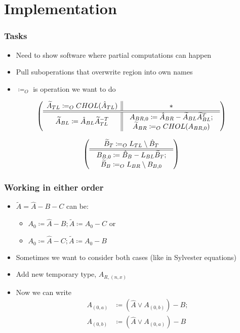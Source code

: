 \documentclass{beamer}
\begin{document}
\section{Implementation}

\frame{\sectionpage}

\begin{frame}
  \frametitle{Tasks}
  \begin{itemize}
  \item Need to show software where partial computations can happen
  \item Pull suboperations that overwrite region into own names
  \item $\coloneqq_O$ is operation we want to do
  \end{itemize}
  \begin{equation*}
    \left( \begin{array}{c || c} \widetilde{A}_{TL} \coloneqq_O CHOL(\hat{A}_{TL}) & * \\ \hline \hline \widetilde{A}_{BL} \coloneqq \hat{A}_{BL}\widetilde{A}_{TL}^{-T} & \begin{array}{c}
       A_{BR, 0} \coloneqq \hat{A}_{BR} - \widetilde{A}_{BL}\widetilde{A}_{BL}^T;\\
       \widetilde{A}_{BR} \coloneqq_O CHOL(A_{BR, 0})
     \end{array} \end{array} \right)
 \end{equation*}

 \begin{equation*}
   \left( \begin{array}{c} \widetilde{B}_T \coloneqq_O L_{TL} \setminus \hat{B}_T \\ \hline \hline \begin{array}{c}
      B_{B, 0} \coloneqq \hat{B}_B - L_{BL}\widetilde{B}_T;\\
      \widetilde{B}_B \coloneqq_O L_{BR} \setminus B_{B, 0}
    \end{array} \end{array} \right)
 \end{equation*}
\end{frame}

\begin{frame}
  \frametitle{Working in either order}
  \begin{itemize}
  \item $\widetilde{A} = \hat{A} - B - C$ can be:
    \begin{itemize}
    \item $A_0 \coloneqq \hat{A} - B; \widetilde{A} \coloneqq A_0 - C$ or
    \item $A_0 \coloneqq \hat{A} - C; \widetilde{A} \coloneqq A_0 - B$
    \end{itemize}

  \item Sometimes we want to consider both cases (like in Sylvester equations)
  \item Add new temporary type, $A_{R, (n, x)}$
  \item Now we can write
    \begin{align*}
      A_{(0, a)} &\coloneqq (\hat{A} \vee A_{(0, b)}) - B;\\
      A_{(0, b)} &\coloneqq (\hat{A} \vee A_{(0, a)}) - B
    \end{align*}
  \end{itemize}
\end{frame}
\end{document}
